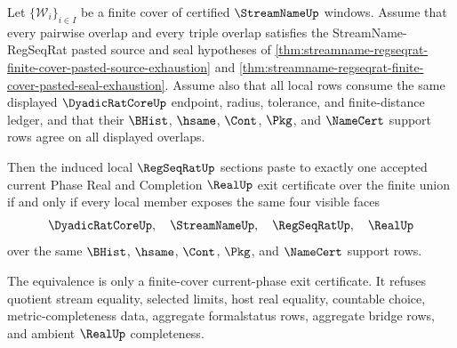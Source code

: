 \begin{theorem}
\label{thm:real-l10-finite-cover-face-pasting-equivalence}
Let $\{\mathcal{W}_i\}_{i\in I}$ be a finite cover of certified $\StreamNameUp$ windows. Assume that every pairwise overlap and every triple overlap satisfies the StreamName-RegSeqRat pasted source and seal hypotheses of \autoref{thm:streamname-regseqrat-finite-cover-pasted-source-exhaustion} and \autoref{thm:streamname-regseqrat-finite-cover-pasted-seal-exhaustion}. Assume also that all local rows consume the same displayed $\DyadicRatCoreUp$ endpoint, radius, tolerance, and finite-distance ledger, and that their $\BHist$, $\hsame$, $\Cont$, $\Pkg$, and $\NameCert$ support rows agree on all displayed overlaps.

Then the induced local $\RegSeqRatUp$ sections paste to exactly one accepted current Phase Real and Completion $\RealUp$ exit certificate over the finite union if and only if every local member exposes the same four visible faces
$$
\DyadicRatCoreUp,\quad \StreamNameUp,\quad \RegSeqRatUp,\quad \RealUp
$$
over the same $\BHist$, $\hsame$, $\Cont$, $\Pkg$, and $\NameCert$ support rows.

The equivalence is only a finite-cover current-phase exit certificate. It refuses quotient stream equality, selected limits, host real equality, countable choice, metric-completeness data, aggregate formalstatus rows, aggregate bridge rows, and ambient $\RealUp$ completeness.
\end{theorem}
